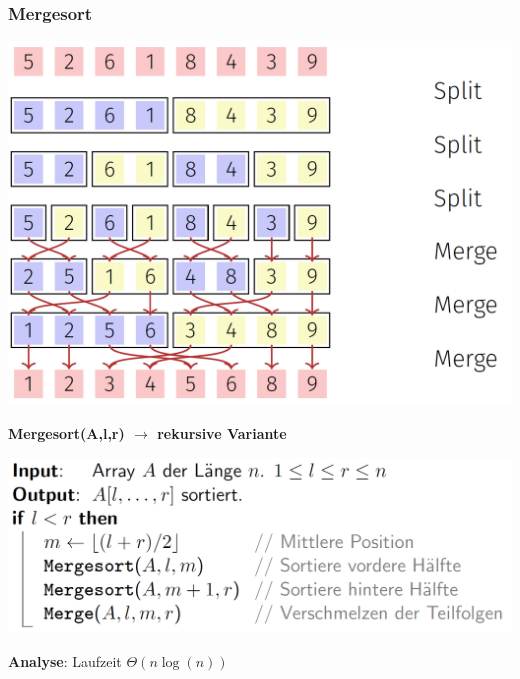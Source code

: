 \begin{sectionbox}
\subsubsection{Mergesort}
\begin{center}
    \includegraphics[width = 0.5\columnwidth]{../img/Mergesort.png}
\end{center}\smallskip
\textbf{Mergesort(A,l,r) $\rightarrow$ rekursive Variante}\par
\includegraphics[width = 0.75\columnwidth]{../img/MergesortCode.png}
\par\smallskip
\textbf{Analyse}: Laufzeit  $\Theta(n \operatorname{log}(n))$
\end{sectionbox}

